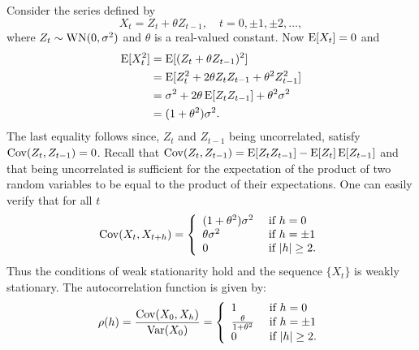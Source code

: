 \begin{example}
Consider the series defined by
\begin{equation}
    X_t = Z_t + \theta Z_{t - 1}, \quad t = 0, \pm 1, \pm 2, \ldots,
\end{equation}
where $Z_t \sim \operatorname{WN}(0, \sigma^2)$ and $\theta$ is a real-valued constant. Now 
$\operatorname{E} [X_t] = 0$ and 
\begin{align*}
    \operatorname{E} [X_t^2] & = \operatorname{E} [ (Z_t + \theta Z_{t - 1})^2 ] \\
               & = \operatorname{E} [ Z_t^2 + 2 \theta Z_t Z_{t - 1} + \theta^2 Z_{t - 1}^2] \\
               & = \sigma^2 + 2 \theta \operatorname{E} [Z_t Z_{t - 1}] +  \theta^2 \sigma^2 \\
               & = (1 + \theta^2) \sigma^2.
\end{align*}
The last equality follows since, $Z_t$ and $Z_{t - 1}$ being uncorrelated, 
satisfy $\operatorname{Cov} (Z_t, Z_{t - 1}) = 0$. Recall that 
$\operatorname{Cov} (Z_t, Z_{t - 1}) = \operatorname{E} [Z_t Z_{t - 1}] - \operatorname{E} [Z_t] \operatorname{E} [Z_{t - 1}]$ 
and that being uncorrelated is sufficient for the expectation of the product 
of two random variables to be equal to the product of their expectations. One 
can easily verify that for all $t$
\begin{equation}
    \operatorname{Cov} (X_t, X_{t + h}) = 
        \left \{ 
            \begin{array}{ll}
                (1 + \theta^2) \sigma^2 & \text{ if } h = 0 \\
                \theta \sigma^2         & \text{ if } h = \pm 1 \\
                0                       & \text{ if } |h| \geq 2.
            \end{array}        
        \right . 
\end{equation} 
Thus the conditions of weak stationarity hold and the sequence $\{ X_t \}$ 
is weakly stationary. The autocorrelation function is given by:
\begin{equation}
    \rho (h) = \frac{\operatorname{Cov} (X_0, X_{h})}{\operatorname{Var}(X_0)} = 
        \left \{ 
            \begin{array}{ll}
                1                             & \text{ if } h = 0 \\
                \frac{\theta}{1 + \theta^2}   & \text{ if } h = \pm 1 \\
                0                             & \text{ if } |h| \geq 2.
            \end{array}        
        \right . 
\end{equation} 
\end{example}

